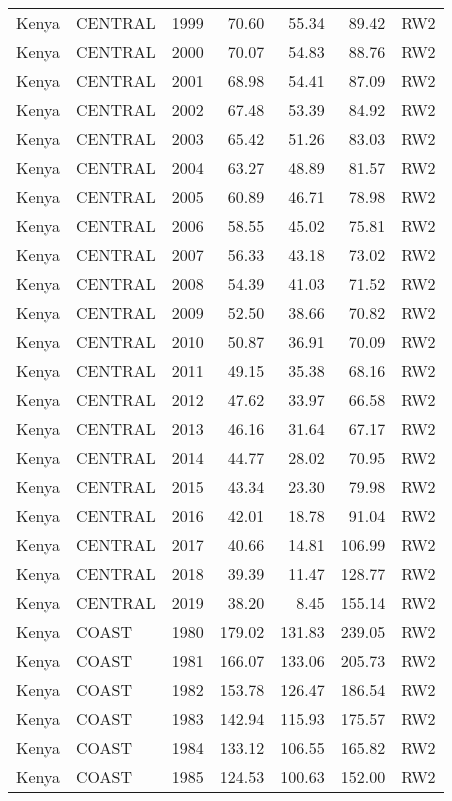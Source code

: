 \begin{longtable}{lllrrrl}
  Kenya & CENTRAL & 1999 & 70.60 & 55.34 & 89.42 & RW2 \\ 
  Kenya & CENTRAL & 2000 & 70.07 & 54.83 & 88.76 & RW2 \\ 
  Kenya & CENTRAL & 2001 & 68.98 & 54.41 & 87.09 & RW2 \\ 
  Kenya & CENTRAL & 2002 & 67.48 & 53.39 & 84.92 & RW2 \\ 
  Kenya & CENTRAL & 2003 & 65.42 & 51.26 & 83.03 & RW2 \\ 
  Kenya & CENTRAL & 2004 & 63.27 & 48.89 & 81.57 & RW2 \\ 
  Kenya & CENTRAL & 2005 & 60.89 & 46.71 & 78.98 & RW2 \\ 
  Kenya & CENTRAL & 2006 & 58.55 & 45.02 & 75.81 & RW2 \\ 
  Kenya & CENTRAL & 2007 & 56.33 & 43.18 & 73.02 & RW2 \\ 
  Kenya & CENTRAL & 2008 & 54.39 & 41.03 & 71.52 & RW2 \\ 
  Kenya & CENTRAL & 2009 & 52.50 & 38.66 & 70.82 & RW2 \\ 
  Kenya & CENTRAL & 2010 & 50.87 & 36.91 & 70.09 & RW2 \\ 
  Kenya & CENTRAL & 2011 & 49.15 & 35.38 & 68.16 & RW2 \\ 
  Kenya & CENTRAL & 2012 & 47.62 & 33.97 & 66.58 & RW2 \\ 
  Kenya & CENTRAL & 2013 & 46.16 & 31.64 & 67.17 & RW2 \\ 
  Kenya & CENTRAL & 2014 & 44.77 & 28.02 & 70.95 & RW2 \\ 
  Kenya & CENTRAL & 2015 & 43.34 & 23.30 & 79.98 & RW2 \\ 
  Kenya & CENTRAL & 2016 & 42.01 & 18.78 & 91.04 & RW2 \\ 
  Kenya & CENTRAL & 2017 & 40.66 & 14.81 & 106.99 & RW2 \\ 
  Kenya & CENTRAL & 2018 & 39.39 & 11.47 & 128.77 & RW2 \\ 
  Kenya & CENTRAL & 2019 & 38.20 & 8.45 & 155.14 & RW2 \\ 
  Kenya & COAST & 1980 & 179.02 & 131.83 & 239.05 & RW2 \\ 
  Kenya & COAST & 1981 & 166.07 & 133.06 & 205.73 & RW2 \\ 
  Kenya & COAST & 1982 & 153.78 & 126.47 & 186.54 & RW2 \\ 
  Kenya & COAST & 1983 & 142.94 & 115.93 & 175.57 & RW2 \\ 
  Kenya & COAST & 1984 & 133.12 & 106.55 & 165.82 & RW2 \\ 
  Kenya & COAST & 1985 & 124.53 & 100.63 & 152.00 & RW2 \\ 

\end{longtable}
